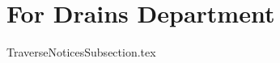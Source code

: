 \documentclass[class=book , crop=false]{standalone}
\begin{document}
\section{For Drains Department}
{TraverseNoticesSubsection.tex}
\end{document}
